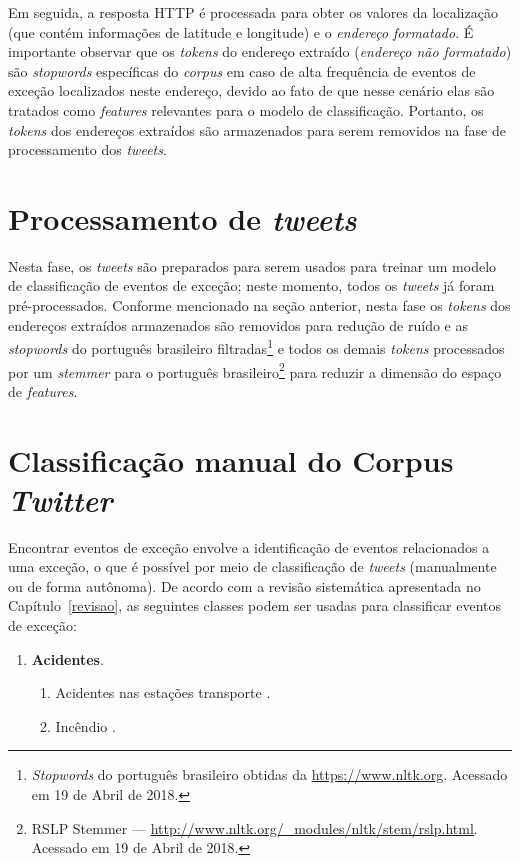 \documentclass[
	12pt,				%
	oneside,			%
	a4paper,			%
	english,			%
	brazil				%
	]{abntex2ppgsi}
\begin{document}
{{{Em seguida, a resposta HTTP é processada para obter os valores da localização (que contém informações de latitude e longitude) e o \emph{endereço formatado}. É importante observar que os \textit{tokens} do endereço extraído (\emph{endereço não formatado}) são \textit{stopwords} específicas do \textit{corpus} em caso de alta frequência de eventos de exceção localizados neste endereço, devido ao fato de que nesse cenário elas são tratados como \textit{features} relevantes para o modelo de classificação. Portanto, os \textit{tokens} dos endereços extraídos são armazenados para serem removidos na fase de processamento dos \textit{tweets}.

\section{Processamento de \textit{tweets}}
\label{processing}

Nesta fase, os \textit {tweets} são preparados para serem usados para treinar um modelo de classificação de eventos de exceção; neste momento, todos os \textit {tweets} já foram pré-processados. Conforme mencionado na seção anterior, nesta fase os \textit{tokens} dos endereços extraídos armazenados são removidos para redução de ruído e as \textit{stopwords} do português brasileiro filtradas\footnote{\textit{Stopwords} do português brasileiro obtidas da  \url{https://www.nltk.org}. Acessado em 19 de Abril de 2018.} e todos os demais \textit{tokens}  processados por um \textit{stemmer} para o  português brasileiro\footnote{RSLP Stemmer --- \url {http://www.nltk.org/\_modules/nltk/stem/rslp.html}. Acessado em 19 de Abril de 2018.} para reduzir a dimensão do espaço de \textit{features}.

\section{Classificação manual do Corpus \textit{Twitter}}
\label{manualClassification}

Encontrar eventos de exceção envolve a identificação de eventos relacionados a uma exceção, o que é possível por meio de classificação de \textit{tweets} (manualmente ou de forma autônoma). De acordo com a revisão sistemática apresentada no Capítulo~\ref{revisao}, as seguintes classes podem ser usadas para classificar eventos de exceção:

\begin{enumerate}
\item \textbf{Acidentes}.
\begin{enumerate}
\item Acidentes nas estações transporte \cite{Itoh2016}.
\item Incêndio \cite{Itoh2016}.
\end{enumerate}


\end{enumerate}}}}
\end{document}
